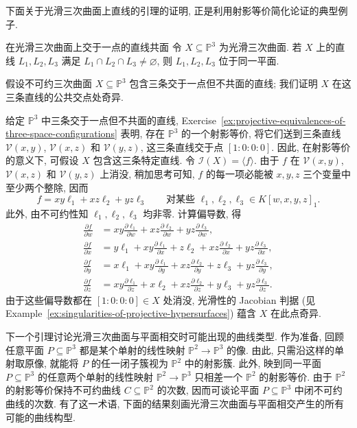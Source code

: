 下面关于光滑三次曲面上直线的引理的证明, 正是利用射影等价简化论证的典型例子.

\begin{Lemma}{在光滑三次曲面上交于一点的直线共面}\leavevmode\label{lem:concurrent-lines-on-smooth-cubic-are-coplanar}
令 $X\subseteq\mathbb{P}^{3}$ 为光滑三次曲面. 若 $X$ 上的直线 $L_{1},L_{2},L_{3}$ 满足 $L_{1}\cap L_{2}\cap L_{3}\ne\varnothing$, 则 $L_{1},L_{2},L_{3}$ 位于同一平面.
\end{Lemma}
\begin{Proof}
假设不可约三次曲面 $X\subseteq\mathbb{P}^{3}$ 包含三条交于一点但不共面的直线; 我们证明 $X$ 在这三条直线的公共交点处奇异.

给定 $\mathbb{P}^{3}$ 中三条交于一点但不共面的直线, Exercise~\ref{ex:projective-equivalences-of-three-space-configurations} 表明, 存在 $\mathbb{P}^{3}$ 的一个射影等价, 将它们送到三条直线 $\mathcal{V}(x,y)$, $\mathcal{V}(x,z)$ 和 $\mathcal{V}(y,z)$, 这三条直线交于点 $[1:0:0:0]$. 因此, 在射影等价的意义下, 可假设 $X$ 包含这三条特定直线. 令 $\mathcal{I}(X)=\langle f\rangle$. 由于 $f$ 在 $\mathcal{V}(x,y)$, $\mathcal{V}(x,z)$ 和 $\mathcal{V}(y,z)$ 上消没, 稍加思考可知, $f$ 的每一项必能被 $x,y,z$ 三个变量中至少两个整除, 因而
\[
  f=xy\ell_{1}+xz\ell_{2}+yz\ell_{3}
  \qquad\text{对某些 }\ell_{1},\ell_{2},\ell_{3}\in K[w,x,y,z]_{1}.
\]
此外, 由不可约性知 $\ell_{1},\ell_{2},\ell_{3}$ 均非零. 计算偏导数, 得
\[
  \begin{aligned}
  \frac{\partial f}{\partial w}
  &=xy\frac{\partial\ell_{1}}{\partial w}+xz\frac{\partial\ell_{2}}{\partial w}+yz\frac{\partial\ell_{3}}{\partial w},\\
  \frac{\partial f}{\partial x}
  &=y\ell_{1}+xy\frac{\partial\ell_{1}}{\partial x}+z\ell_{2}+xz\frac{\partial\ell_{2}}{\partial x}+yz\frac{\partial\ell_{3}}{\partial x},\\
  \frac{\partial f}{\partial y}
  &=x\ell_{1}+xy\frac{\partial\ell_{1}}{\partial y}+xz\frac{\partial\ell_{2}}{\partial y}+z\ell_{3}+yz\frac{\partial\ell_{3}}{\partial y},\\
  \frac{\partial f}{\partial z}
  &=xy\frac{\partial\ell_{1}}{\partial z}+x\ell_{2}+xz\frac{\partial\ell_{2}}{\partial z}+y\ell_{3}+yz\frac{\partial\ell_{3}}{\partial z}.
  \end{aligned}
\]
由于这些偏导数都在 $[1:0:0:0]\in X$ 处消没, 光滑性的 Jacobian 判据 (见 Example~\ref{ex:singularities-of-projective-hypersurfaces}) 蕴含 $X$ 在此点奇异.
\end{Proof}

下一个引理讨论光滑三次曲面与平面相交时可能出现的曲线类型. 作为准备, 回顾任意平面 $P\subseteq\mathbb{P}^{3}$ 都是某个单射的线性映射 $\mathbb{P}^{2}\to\mathbb{P}^{3}$ 的像. 由此, 只需沿这样的单射取原像, 就能将 $P$ 的任一闭子簇视为 $\mathbb{P}^{2}$ 中的射影簇. 此外, 映到同一平面 $P\subseteq\mathbb{P}^{3}$ 的任意两个单射的线性映射 $\mathbb{P}^{2}\to\mathbb{P}^{3}$ 只相差一个 $\mathbb{P}^{2}$ 的射影等价. 由于 $\mathbb{P}^{2}$ 的射影等价保持不可约曲线 $C\subseteq\mathbb{P}^{2}$ 的次数, 因而可谈论平面 $P\subseteq\mathbb{P}^{3}$ 中闭不可约曲线的\textquotedbl{}次数\textquotedbl{}. 有了这一术语, 下面的结果刻画光滑三次曲面与平面相交产生的所有可能的曲线构型.


